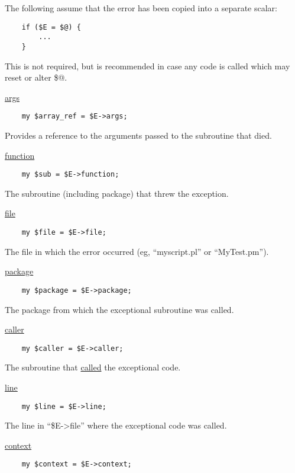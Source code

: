 \documentclass[]{article}
\renewcommand{\emph}[1]{\underline{#1}}
\begin{document}
The following assume that the error has been copied into a separate
scalar:

\begin{verbatim}
    if ($E = $@) {
        ...
    }
\end{verbatim}

This is not required, but is recommended in case any code is called
which may reset or alter \$@.

\emph{args}

\begin{verbatim}
    my $array_ref = $E->args;
\end{verbatim}

Provides a reference to the arguments passed to the subroutine that
died.

\emph{function}

\begin{verbatim}
    my $sub = $E->function;
\end{verbatim}

The subroutine (including package) that threw the exception.

\emph{file}

\begin{verbatim}
    my $file = $E->file;
\end{verbatim}

The file in which the error occurred (eg, ``myscript.pl'' or
``MyTest.pm'').

\emph{package}

\begin{verbatim}
    my $package = $E->package;
\end{verbatim}

The package from which the exceptional subroutine was called.

\emph{caller}

\begin{verbatim}
    my $caller = $E->caller;
\end{verbatim}

The subroutine that \emph{called} the exceptional code.

\emph{line}

\begin{verbatim}
    my $line = $E->line;
\end{verbatim}

The line in ``\$E-\textgreater{}file'' where the exceptional code was
called.

\emph{context}

\begin{verbatim}
    my $context = $E->context;
\end{verbatim}
\end{document}
